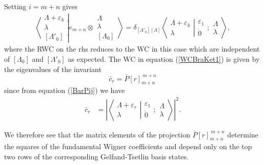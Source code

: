 \documentclass[12pt]{article}
\begin{document}
Setting $i=m+n$ gives
\begin{align}
\left\langle\left. 
\begin{array}{c} \Lambda+\varepsilon_k\\ \lambda \\ {[\Lambda'_0]} \end{array}
\right|\right.
\left.
e_{m+n} \otimes \begin{array}{c} \Lambda \\ \lambda \\
{[\Lambda_0]} \end{array}
\right\rangle = \delta_{[\Lambda'_0][\Lambda]}
 \left\langle\left. 
\begin{array}{c} \Lambda+\varepsilon_k\\ \lambda \end{array}
\right|\right.
\left.
\begin{array}{c} 
\varepsilon_1 \\ \dot{0}
\end{array}
;
\begin{array}{c} \Lambda \\ 
\lambda \end{array}
\right\rangle  , \label{WCBraKet1}
\end{align}
where the RWC on the rhs reduces to the WC in this case which are independent of $[\Lambda_0]$ and $[\Lambda'_0]$ as expected. 
The WC in equation (\ref{WCBraKet1}) is given by the eigenvalues of the invariant
$$ 
\bar{c}_r = \bar{P}[r]_{m+n}^{\ m+n}
$$
since from equation (\ref{BarPij}) we have
\begin{align}
\bar{c}_r  &= \left| \left\langle\left. 
\begin{array}{c} \Lambda+\varepsilon_r\\ \lambda \end{array}
\right|\right.
\left.
\begin{array}{c} \varepsilon_1 \\
\dot{0} \end{array} 
;
 \begin{array}{c} \Lambda \\
\lambda \end{array}
\right\rangle \right|^2. \label{WigCoefCBar}
\end{align}

We therefore see that the matrix elements of the projection $\bar{P}[r]_{m+n}^{\ m+n}$ determine
the squares of the fundamental Wigner coefficients and depend only on the top two rows of the corresponding Gelfand-Tsetlin basis states.
\end{document}
